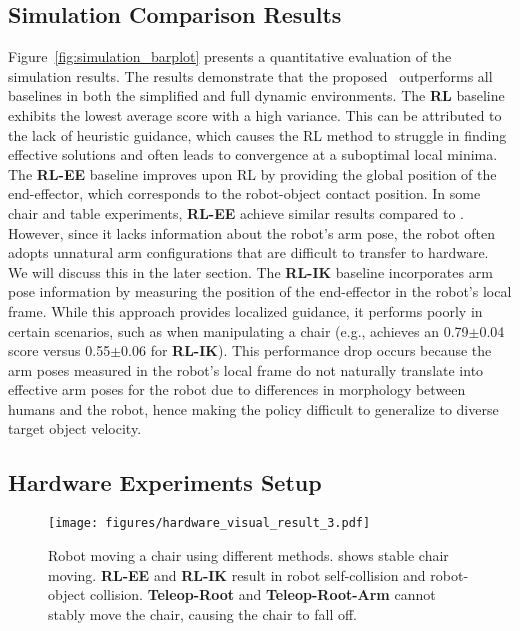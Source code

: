\subsection{Simulation Comparison Results}
Figure~\ref{fig:simulation_barplot} presents a quantitative evaluation of the simulation results. The results demonstrate that the proposed \method \  outperforms all baselines in both the simplified and full dynamic environments. The \textbf{RL} baseline exhibits the lowest average score with a high variance. This can be attributed to the lack of heuristic guidance, which causes the RL method to struggle in finding effective solutions and often leads to convergence at a suboptimal local minima. The \textbf{RL-EE} baseline improves upon RL by providing the global position of the end-effector, which corresponds to the robot-object contact position. In some chair and table experiments, \textbf{RL-EE} achieve similar results compared to \textbf{\method}. However, since it lacks information about the robot’s arm pose, the robot often adopts unnatural arm configurations that are difficult to transfer to hardware. We will discuss this in the later section. The \textbf{RL-IK} baseline incorporates arm pose information by measuring the position of the end-effector in the robot’s local frame. While this approach provides localized guidance, it performs poorly in certain scenarios, such as when manipulating a chair (e.g., \textbf{\method} achieves an  0.79$\pm$0.04 score versus 0.55$\pm$0.06 for \textbf{RL-IK}). This performance drop occurs because the arm poses measured in the robot’s local frame do not naturally translate into effective arm poses for the robot due to differences in morphology between humans and the robot, hence making the policy difficult to generalize to diverse target object velocity.




\subsection{Hardware Experiments Setup} \label{sec:hardware_setup}



\begin{figure*}[t]
 \centering
\texttt{[image: figures/hardware\_visual\_result\_3.pdf]}

\caption{Robot moving a chair using different methods. \textbf{\method} shows stable chair moving. \textbf{RL-EE} and \textbf{RL-IK} result in robot self-collision and robot-object collision. \textbf{Teleop-Root} and \textbf{Teleop-Root-Arm} cannot stably move the chair, causing the chair to fall off. }
\label{fig:hardware_visual}
 \vspace{-0.3cm}
\end{figure*}


